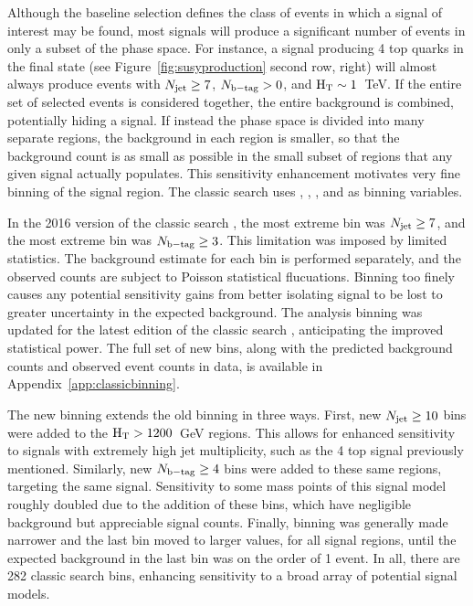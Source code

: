     Although the baseline selection defines the class of events in which a signal of interest may be found, most signals will produce a significant number of events in only a subset of the phase space.
    For instance, a signal producing 4 top quarks in the final state (see Figure~\ref{fig:susyproduction} second row, right) will almost always produce events with $N_{\mathrm{jet}} \geq 7$, $N_{\mathrm{b-tag}} > 0$, and $\mathrm{H_{T}} \sim 1$~TeV.
    If the entire set of selected events is considered together, the entire background is combined, potentially hiding a signal.
    If instead the phase space is divided into many separate regions, the background in each region is smaller, so that the background count is as small as possible in the small subset of regions that any given signal actually populates.
    This sensitivity enhancement motivates very fine binning of the signal region.
    The classic search uses \mttwo, \Ht, \njet, and \nb as binning variables.

    In the 2016 version of the classic search \cite{MT2_2016}, the most extreme \njet\xspace bin was $N_{\mathrm{jet}} \geq 7$, and the most extreme \nb bin was $N_{\mathrm{b-tag}} \geq 3$.
    This limitation was imposed by limited statistics.
    The background estimate for each bin is performed separately, and the observed counts are subject to Poisson statistical flucuations.
    Binning too finely causes any potential sensitivity gains from better isolating signal to be lost to greater uncertainty in the expected background.
    The analysis binning was updated for the latest edition of the classic search \cite{MT2_2019}, anticipating the improved statistical power.
    The full set of new bins, along with the predicted background counts and observed event counts in data, is available in Appendix~\ref{app:classicbinning}.

    The new binning extends the old binning in three ways.
    First, new $N_{\mathrm{jet}} \geq 10$ bins were added to the $\mathrm{H_{T}} > 1200$~GeV regions.
    This allows for enhanced sensitivity to signals with extremely high jet multiplicity, such as the 4 top signal previously mentioned.
    Similarly, new $N_{\mathrm{b-tag}} \geq 4$ bins were added to these same regions, targeting the same signal.
    Sensitivity to some mass points of this signal model roughly doubled due to the addition of these bins, which have negligible background but appreciable signal counts.
    Finally, \mttwo binning was generally made narrower and the last bin moved to larger \mttwo values, for all signal regions, until the expected background in the last bin was on the order of 1 event.
    In all, there are 282 classic search bins, enhancing sensitivity to a broad array of potential signal models.

